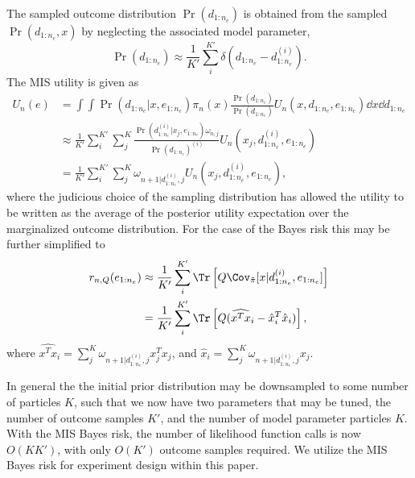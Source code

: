\documentclass[aps,nofootinbib,twocolumn,superscriptaddress]{revtex4}
\newcommand{\mps}{x}
\newcommand{\eps}{e}
\newcommand{\data}{d}
\begin{document}
The sampled outcome distribution $\Pr(d_{1:n_e})$ is obtained from the sampled
$\Pr(\data_{1:n_e},\mps)$ by neglecting the associated model parameter,
\begin{equation}
    \Pr(\data_{1:n_e}) \approx
        \frac{1}{K'}\sum \limits_{i}^{K'} \delta
        \left(\data_{1:n_e}-\data_{1:n_e}^{(i)}\right).
    \label{eq:sampled-marginalized-distribution}
\end{equation}
The MIS utility is given as
\begin{align}
    U_n(\eps)
        &= \int\int \Pr(\data_{1:n_e}|\mps,\eps_{1:n_e})\pi_n(\mps)
            \frac{\Pr(\data_{1:n_e})}{\Pr(\data_{1:n_e})}
            U_n(\mps,\data_{1:n_e},\eps_{1:n_e})
            \dd\mps \dd\data_{1:n_e} \nonumber\\
        &\approx \frac{1}{K'}\sum \limits_{i}^{K'}\sum \limits_{j}^{K}
            \frac{\Pr(\data_{1:n_e}^{(i)}|\mps_j,\eps_{1:n_e})\omega_{n,j}}{
            \Pr(\data_{1:n_e})^{(i)}}
            U_n(\mps_j,\data_{1:n_e}^{(i)},\eps_{1:n_e})\nonumber \\
        &= \frac{1}{K'}\sum \limits_{i}^{K'}\sum \limits_{j}^{K} \omega_{n+1|
            \data_{1:n_e}^{(i)},j}U_n(\mps_j,\data_{1:n_e}^{(i)},\eps_{1:n_e}),
    \label{eq:mis-average-utility-expanded}
\end{align}
where the judicious choice of the sampling distribution has allowed the utility
to be written as the average of the posterior utility expectation  over the
marginalized outcome distribution.
For the case of the Bayes risk this may be further simplified to
\begin{align}
    r_{n,Q}(\eps_{1:n_e}) &\approx
        \frac{1}{K'}\sum \limits_i^{K'}  \Tr\left[ Q  \Cov_{\tilde{\pi}}
        [\mps|\data_{1:n_e}^{(i)},\eps_{1:n_e}]\right] \nonumber\\
        &=\frac{1}{K'}\sum \limits_i^{K'}
            \Tr\left[ Q(\widehat{x^Tx}_{i}-\hat{x}_i^T\hat{x}_i)\right],
    \label{eq:mis-bayes-risk-sampled}
\end{align}
where $\widehat{x^Tx}_i=\sum
\limits_{j}^K\omega_{n+1|\data_{1:n_e}^{(i)},j}x_j^Tx_j$, and $\hat{x}_i=\sum
\limits_{j}^K\omega_{n+1|\data_{1:n_e}^{(i)},j}x_j$.

In general the the initial prior distribution may be downsampled to some number
of particles $K$, such that we now have two parameters that may be tuned, the
number of outcome samples $K'$, and the number of model parameter particles $K$.
With the MIS Bayes risk, the number of likelihood function calls is now
$O(KK')$, with only $O(K')$ outcome samples required.
We utilize the MIS Bayes risk for experiment design within this paper.
\end{document}

